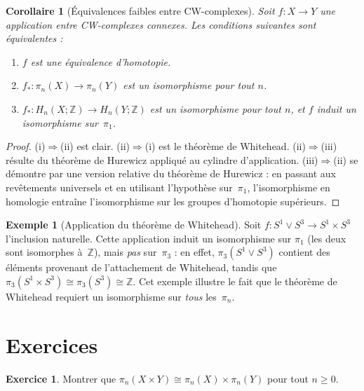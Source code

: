 \documentclass[12pt,a4paper,openany]{book}
\theoremstyle{definition}
\newtheorem{exemple}[definition]{Exemple}
\newtheorem{exercice}{Exercice}[chapter]
\theoremstyle{plain}
\newtheorem{corollaire}[definition]{Corollaire}
\theoremstyle{remark}
\newcommand{\Z}{\mathbb{Z}}
\begin{document}
\begin{corollaire}[Équivalences faibles entre CW-complexes]\label{cor:equi-faible}
  Soit $f \colon X \to Y$ une application entre CW-complexes connexes. Les
  conditions suivantes sont équivalentes :
  \begin{enumerate}[label=(\roman*)]
    \item $f$ est une équivalence d'homotopie.
    \item $f_* \colon \pi_n(X) \to \pi_n(Y)$ est un isomorphisme pour tout $n$.
    \item $f_* \colon H_n(X; \Z) \to H_n(Y; \Z)$ est un isomorphisme pour tout $n$,
          et $f$ induit un isomorphisme sur~$\pi_1$.
  \end{enumerate}
\end{corollaire}

\begin{proof}
  (i)$\Rightarrow$(ii) est clair. (ii)$\Rightarrow$(i) est le théorème de Whitehead.
  (ii)$\Rightarrow$(iii) résulte du théorème de Hurewicz appliqué au cylindre
  d'application. (iii)$\Rightarrow$(ii) se démontre par une version relative du
  théorème de Hurewicz : en passant aux revêtements universels et en utilisant
  l'hypothèse sur~$\pi_1$, l'isomorphisme en homologie entraîne l'isomorphisme
  sur les groupes d'homotopie supérieurs.
\end{proof}

\begin{exemple}[Application du théorème de Whitehead]\label{ex:whitehead-application}
  Soit $f \colon S^1 \vee S^3 \to S^1 \times S^3$ l'inclusion naturelle.
  Cette application induit un isomorphisme sur $\pi_1$ (les deux sont isomorphes
  à~$\Z$), mais \emph{pas} sur~$\pi_3$ : en effet, $\pi_3(S^1 \vee S^3)$ contient
  des éléments provenant de l'attachement de Whitehead, tandis que
  $\pi_3(S^1 \times S^3) \cong \pi_3(S^3) \cong \Z$. Cet exemple illustre le fait
  que le théorème de Whitehead requiert un isomorphisme sur \emph{tous} les~$\pi_n$.
\end{exemple}

\section{Exercices}\label{sec:exo-homotopie-sup}

\begin{exercice}\label{exo:homotopie-1}
  Montrer que $\pi_n(X \times Y) \cong \pi_n(X) \times \pi_n(Y)$ pour tout $n \geq 0$.
\end{exercice}
\end{document}
